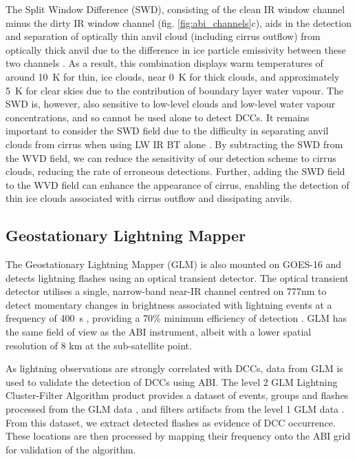 The Split Window Difference (SWD), consisting of the clean IR window channel minus the dirty IR window channel (fig. \ref{fig:abi_channels}c), aids in the detection and separation of optically thin anvil cloud (including cirrus outflow) from optically thick anvil due to the difference in ice particle emissivity between these two channels \citep{heidinger_gazing_2009}.
As a result, this combination displays warm temperatures of around 10~\unit{K} for thin, ice clouds, near 0~\unit{K} for thick clouds, and approximately 5~\unit{K} for clear skies due to the contribution of boundary layer water vapour.
The SWD is, however, also sensitive to low-level clouds and low-level water vapour concentrations, and so cannot be used alone to detect DCCs.
It remains important to consider the SWD field due to the difficulty in separating anvil clouds from cirrus when using LW IR BT alone \citep{hong_detection_2005}. 
By subtracting the SWD from the WVD field, we can reduce the sensitivity of our detection scheme to cirrus clouds, reducing the rate of erroneous detections.
Further, adding the SWD field to the WVD field can enhance the appearance of cirrus, enabling the detection of thin ice clouds associated with cirrus outflow and dissipating anvils.


\subsection{Geostationary Lightning Mapper}

The Geostationary Lightning Mapper (GLM) is also mounted on GOES-16 and detects lightning flashes using an optical transient detector.
The optical transient detector utilises a single, narrow-band near-IR channel centred on 777\unit{nm} \citep{orville_absolute_1984} to detect momentary changes in brightness associated with lightning events at a frequency of 400\unit{\mu s} \citep{christian_global_2003}, providing a 70\% minimum efficiency of detection \citep{goodman_goes-r_2013}.
GLM has the same field of view as the ABI instrument, albeit with a lower spatial resolution of 8 \unit{km} at the sub-satellite point.

As lightning observations are strongly correlated with DCCs, data from GLM is used to validate the detection of DCCs using ABI.
The level 2 GLM Lightning Cluster-Filter Algorithm product provides a dataset of events, groups and flashes processed from the GLM data \citep{peterson_research_2019}, and filters artifacts from the level 1 GLM data \citep{peterson_removing_2020}.
From this dataset, we extract detected flashes as evidence of DCC occurrence.
These locations are then processed by mapping their frequency onto the ABI grid for validation of the algorithm.

